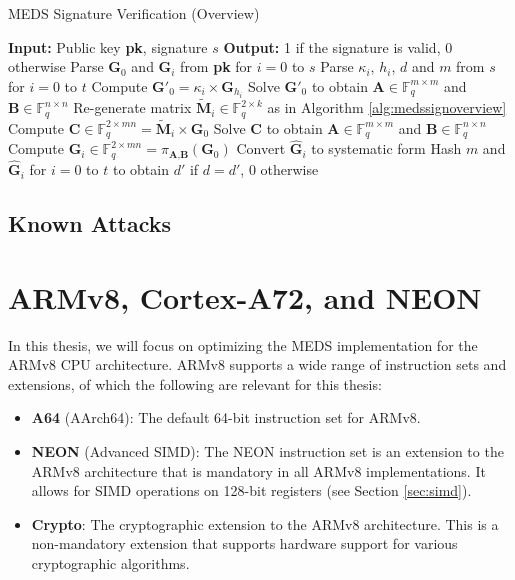 \documentclass[11pt,a4paper]{report}
\theoremstyle{definition}
\begin{document}
\begin{algorithm}
  \caption{MEDS Signature Verification (Overview)}
  \label{alg:medsverifyoverview}
  \begin{algorithmic}[1]
    \State \textbf{Input:} Public key \textbf{pk}, signature $s$
    \State \textbf{Output:} 1 if the signature is valid, 0 otherwise
    \State Parse $\textbf{G}_0$ and $\textbf{G}_i$ from \textbf{pk} for $i = 0$ to $s$
    \State Parse $\kappa_i$, $h_i$, $d$ and $m$ from $s$ for $i = 0$ to $t$
        \State Compute $\textbf{G}'_{0} = \kappa_i \times \textbf{G}_{h_i}$
        \State Solve $\textbf{G}'_{0}$ to obtain $\textbf{A} \in \mathbb{F}_q^{m \times m}$ and $\textbf{B} \in \mathbb{F}_q^{n \times n}$
      \Else
        \State Re-generate matrix $\tilde{\textbf{M}}_i \in \mathbb{F}_q^{2 \times k}$ as in Algorithm \ref{alg:medssignoverview}
        \State Compute $\textbf{C} \in \mathbb{F}_q^{2 \times mn} = \tilde{\textbf{M}}_i \times \textbf{G}_0$
        \State Solve $\textbf{C}$ to obtain $\textbf{A} \in \mathbb{F}_q^{m \times m}$ and $\textbf{B} \in \mathbb{F}_q^{n \times n}$
      \EndIf
      \State Compute $\hat{\textbf{G}}_i \in \mathbb{F}_q^{2 \times mn} = \pi_{\textbf{A}, \textbf{B}}(\textbf{G}_0)$
      \State Convert $\hat{\textbf{G}}_i$ to systematic form
    \EndFor
    \State Hash $m$ and $\hat{\textbf{G}}_i$ for $i = 0$ to $t$ to obtain $d'$
    \State {} if $d = d'$, 0 otherwise
  \end{algorithmic}
\end{algorithm}

\subsection{Known Attacks}

\section{ARMv8, Cortex-A72, and NEON}
\label{sec:armv8}
In this thesis, we will focus on optimizing the MEDS implementation for the ARMv8 CPU architecture. ARMv8 supports a wide range of instruction sets and extensions, of which the following are relevant for this thesis:
\begin{itemize}
  \item \textbf{A64} (AArch64): The default 64-bit instruction set for ARMv8.
  \item \textbf{NEON} (Advanced SIMD): The NEON instruction set is an extension to the ARMv8 architecture that is mandatory in all ARMv8 implementations. It allows for SIMD operations on 128-bit registers (see Section \ref{sec:simd}).
  \item \textbf{Crypto}: The cryptographic extension to the ARMv8 architecture. This is a non-mandatory extension that supports hardware support for various cryptographic algorithms.
\end{itemize}
\end{document}
